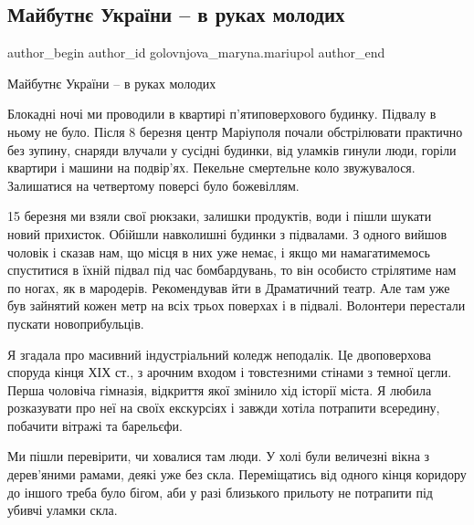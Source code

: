  
 
 
 
 

\subsection{Майбутнє України – в руках молодих}
\label{sec:20_04_2022.fb.golovnjova_maryna.mariupol.1.maibutn__ukra_ni___v}

\ifcmt
 author_begin
   author_id golovnjova_maryna.mariupol
 author_end
\fi

Майбутнє України – в руках молодих

Блокадні ночі ми проводили в квартирі п'ятиповерхового будинку. Підвалу в ньому
не було. Після 8 березня центр Маріуполя почали обстрілювати практично без
зупину, снаряди влучали у сусідні будинки, від уламків гинули люди, горіли
квартири і машини на подвір'ях. Пекельне смертельне коло звужувалося.
Залишатися на четвертому поверсі було божевіллям. 

15 березня ми взяли свої рюкзаки, залишки продуктів, води і пішли шукати новий
прихисток. Обійшли навколишні будинки з підвалами. З одного вийшов чоловік і
сказав нам, що місця в них уже немає, і якщо ми намагатимемось спуститися в
їхній підвал під час бомбардувань, то він особисто стрілятиме нам по ногах, як
в мародерів. Рекомендував йти в Драматичний театр. Але там уже був зайнятий
кожен метр на всіх трьох поверхах і в підвалі. Волонтери перестали пускати
новоприбульців.

Я згадала про масивний індустріальний коледж неподалік. Це двоповерхова споруда
кінця ХІХ ст., з арочним входом і товстезними стінами з темної цегли. Перша
чоловіча гімназія, відкриття якої змінило хід історії міста. Я любила
розказувати про неї на своїх екскурсіях і завжди хотіла потрапити всередину,
побачити вітражі та барельєфи. 

Ми пішли перевірити, чи ховалися там люди. У холі були величезні вікна з
дерев'яними рамами, деякі уже без скла. Переміщатись від одного кінця коридору
до іншого треба було бігом, аби у разі близького прильоту не потрапити під
убивчі уламки скла. 

